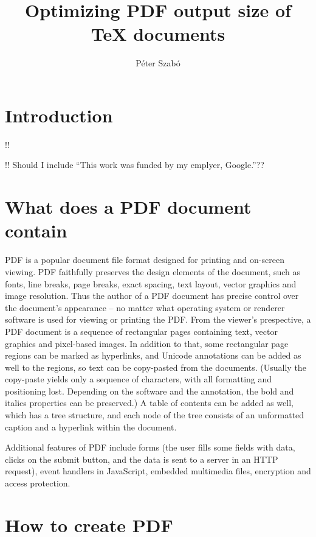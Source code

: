 \documentclass{ltugproc}
\author{P\'eter Szab\'o}
\title{Optimizing PDF output size of \TeX{} documents}
\begin{document}
\maketitle

\section{Introduction}

!!

!! Should I include ``This work was funded by my emplyer, Google.''??

\section{What does a PDF document contain}

PDF is a popular document file format designed for printing and on-screen
viewing. PDF faithfully preserves the design elements of the document, such
as fonts, line breaks, page breaks, exact spacing, text layout, vector
graphics and image resolution. Thus the author of a PDF document has precise
control over the document's appearance -- no matter what operating system or
renderer software is used for viewing or printing the PDF. From the viewer's
prespective, a PDF document is a sequence of rectangular pages containing
text, vector graphics and pixel-based images. In addition to that, some
rectangular page regions can be marked as hyperlinks, and Unicode
annotations can be added as well to the regions, so text can be copy-pasted
from the documents. (Usually the copy-paste yields only a sequence of
characters, with all formatting and positioning lost. Depending on the
software and the annotation, the bold and italics properties can be
preserved.) A table of contents can be added as well, which has a tree
structure, and each node of the tree consists of an unformatted caption and
a hyperlink within the document.

Additional features of PDF include forms (the user fills some fields with
data, clicks on the submit button, and the data is sent to a server in an
HTTP request), event handlers in JavaScript, embedded multimedia files,
encryption and access protection.

\section{How to create PDF}
\end{document}
